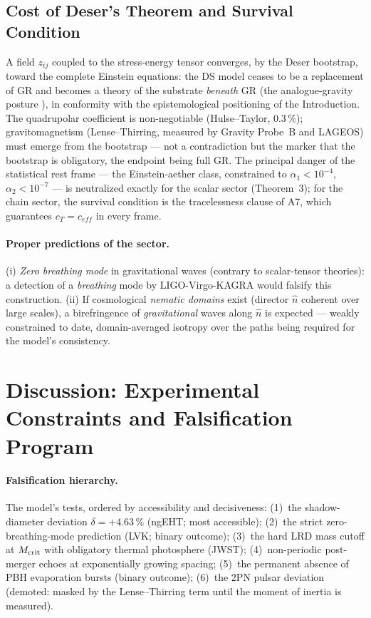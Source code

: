\documentclass[11pt,a4paper]{article}
\theoremstyle{plain}
\theoremstyle{remark}
\begin{document}
\subsection{Cost of Deser's Theorem and Survival Condition}
A field $z_{ij}$ coupled to the stress-energy tensor converges, by the Deser bootstrap, toward the complete Einstein equations: the DS model ceases to be a replacement of GR and becomes a theory of the substrate \emph{beneath} GR (the analogue-gravity posture \cite{barcelo, volovik}), in conformity with the epistemological positioning of the Introduction. The quadrupolar coefficient is non-negotiable (Hulse--Taylor, $0.3\,\%$); gravitomagnetism (Lense--Thirring, measured by Gravity Probe~B and LAGEOS) must emerge from the bootstrap --- not a contradiction but the marker that the bootstrap is obligatory, the endpoint being full GR. The principal danger of the statistical rest frame --- the Einstein-aether class, constrained to $\alpha_1 < 10^{-4}$, $\alpha_2 < 10^{-7}$ \cite{jacobson_ae, will_ppn} --- is neutralized exactly for the scalar sector (Theorem~3); for the chain sector, the survival condition is the tracelessness clause of A7, which guarantees $c_T = c_{eff}$ in every frame.

\paragraph{Proper predictions of the sector.} (i) \emph{Zero breathing mode} in gravitational waves (contrary to scalar-tensor theories): a detection of a \emph{breathing} mode by LIGO-Virgo-KAGRA would falsify this construction. (ii) If cosmological \emph{nematic domains} exist (director $\hat{n}$ coherent over large scales), a birefringence of \emph{gravitational} waves along $\hat{n}$ is expected --- weakly constrained to date, domain-averaged isotropy over the paths being required for the model's consistency.

\section{Discussion: Experimental Constraints and Falsification Program}
\label{sec:discussion}

\paragraph{Falsification hierarchy.} The model's tests, ordered by accessibility and decisiveness: (1)~the shadow-diameter deviation $\delta = +4.63\,\%$ (ngEHT; most accessible); (2)~the strict zero-breathing-mode prediction (LVK; binary outcome); (3)~the hard LRD mass cutoff at $M_{\rm crit}$ with obligatory thermal photosphere (JWST); (4)~non-periodic post-merger echoes at exponentially growing spacing; (5)~the permanent absence of PBH evaporation bursts (binary outcome); (6)~the 2PN pulsar deviation (demoted: masked by the Lense--Thirring term until the moment of inertia is measured).
\end{document}

